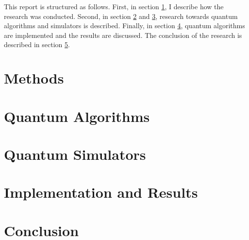 \documentclass[a4paper,12pt]{article}
\begin{document}
This report is structured as follows. First, in section \ref{sec:methods}, I describe how the research was conducted.
Second, in section \ref{sec:quantum-algorithms} and \ref{sec:quantum-simulators}, research towards quantum algorithms and simulators is described.
Finally, in section \ref{sec:implementation-and-results}, quantum algorithms are implemented and the results are discussed.
The conclusion of the research is described in section \ref{sec:conclusion}.

\section{Methods} \label{sec:methods}

\section{Quantum Algorithms} \label{sec:quantum-algorithms}

\section{Quantum Simulators} \label{sec:quantum-simulators}

\section{Implementation and Results} \label{sec:implementation-and-results}

\section{Conclusion} \label{sec:conclusion}

\printbibliography[heading=bibintoc]
\end{document}
